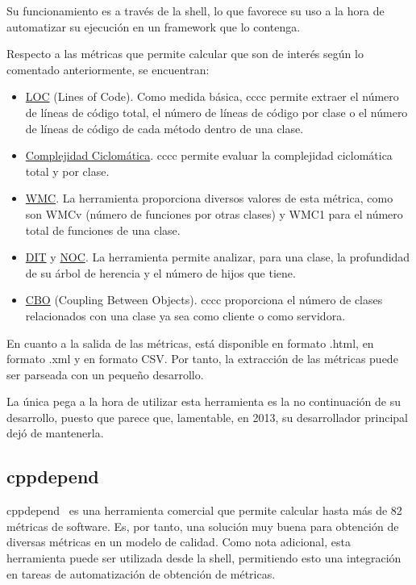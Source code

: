 \documentclass[11pt]{article}
\begin{document}
Su funcionamiento es a través de la shell, lo que favorece su uso a la hora de automatizar su ejecución en un framework que lo contenga.

Respecto a las métricas que permite calcular que son de interés según lo comentado anteriormente, se encuentran:

\begin{itemize}
\item{\underline{LOC} (Lines of Code)}. Como medida básica, cccc permite extraer el número de líneas de código total, el número de líneas de código por clase o el número de líneas de código de cada método dentro de una clase.
\item{\underline{Complejidad Ciclomática}}. cccc permite evaluar la complejidad ciclomática total y por clase.
\item{\underline{WMC}}. La herramienta proporciona diversos valores de esta métrica, como son WMCv (número de funciones por otras clases) y WMC1 para el número total de funciones de una clase.
\item{\underline{DIT} y \underline{NOC}}. La herramienta permite analizar, para una clase, la profundidad de su árbol de herencia y el número de hijos que tiene.
\item{\underline{CBO} (Coupling Between Objects)}. cccc proporciona el número de clases relacionados con una clase ya sea como cliente o como servidora.

\end{itemize}

En cuanto a la salida de las métricas, está disponible en formato .html, en formato .xml y en formato CSV. Por tanto, la extracción de las métricas puede ser parseada con un pequeño desarrollo.

La única pega a la hora de utilizar esta herramienta es la no continuación de su desarrollo, puesto que parece que, lamentable, en 2013, su desarrollador principal dejó de mantenerla.

\subsection{cppdepend}

cppdepend~\cite{metrictools:cppdepend} es una herramienta comercial que permite calcular hasta más de 82 métricas de software. Es, por tanto, una solución muy buena para obtención de diversas métricas en un modelo de calidad. Como nota adicional, esta herramienta puede ser utilizada desde la shell, permitiendo esto una integración en tareas de automatización de obtención de métricas.
\end{document}
